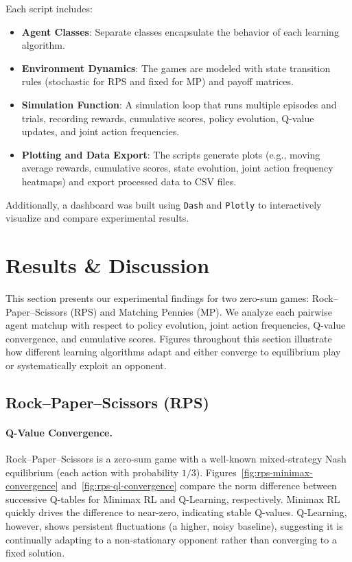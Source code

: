 \documentclass[11pt]{article}
\begin{document}
Each script includes:
\begin{itemize}[noitemsep]
    \item \textbf{Agent Classes}: Separate classes encapsulate the behavior of each learning algorithm.
    \item \textbf{Environment Dynamics}: The games are modeled with state transition rules (stochastic for RPS and fixed for MP) and payoff matrices.
    \item \textbf{Simulation Function}: A simulation loop that runs multiple episodes and trials, recording rewards, cumulative scores, policy evolution, Q-value updates, and joint action frequencies.
    \item \textbf{Plotting and Data Export}: The scripts generate plots (e.g., moving average rewards, cumulative scores, state evolution, joint action frequency heatmaps) and export processed data to CSV files.
\end{itemize}
    
Additionally, a dashboard was built using \texttt{Dash} and \texttt{Plotly} to interactively visualize and compare experimental results.    

\section{Results \& Discussion}
\label{sec:results-discussion}

This section presents our experimental findings for two zero-sum games: 
Rock--Paper--Scissors (RPS) and Matching Pennies (MP). We analyze each 
pairwise agent matchup with respect to policy evolution, joint action 
frequencies, Q-value convergence, and cumulative scores. Figures 
throughout this section illustrate how different learning algorithms 
adapt and either converge to equilibrium play or systematically exploit 
an opponent.

\subsection{Rock--Paper--Scissors (RPS)}

\paragraph{Q-Value Convergence.}
Rock--Paper--Scissors is a zero-sum game with a well-known mixed-strategy 
Nash equilibrium (each action with probability $1/3$). 
Figures~\ref{fig:rps-minimax-convergence} and~\ref{fig:rps-ql-convergence} 
compare the norm difference between successive Q-tables for 
Minimax RL and Q-Learning, respectively. Minimax RL quickly drives the 
difference to near-zero, indicating stable Q-values. Q-Learning, however, 
shows persistent fluctuations (a higher, noisy baseline), suggesting it 
is continually adapting to a non-stationary opponent rather than 
converging to a fixed solution.
\end{document}
